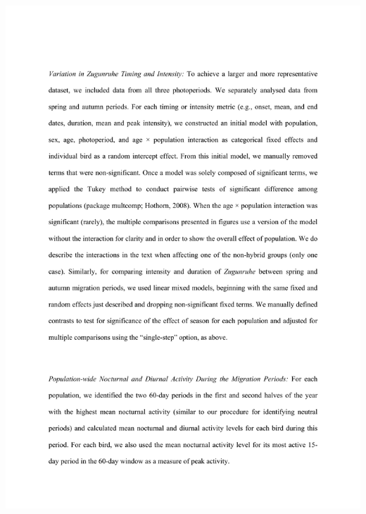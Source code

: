 \documentclass[a4paper, twoside]{templates/ociamthesis}
\begin{document}
\includegraphics[width=1\linewidth]{pdf_chapters/zug/zug_supp_crop_Part07}
\end{document}
